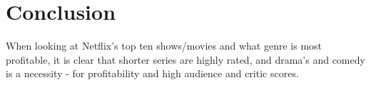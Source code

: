 \documentclass[11pt,preprint, authoryear]{elsarticle}
\numberwithin{equation}{section}
\numberwithin{figure}{section}
\numberwithin{table}{section}
\begin{document}
\hypertarget{conclusion}{%
\section{Conclusion}\label{conclusion}}

When looking at Netflix's top ten shows/movies and what genre is most
profitable, it is clear that shorter series are highly rated, and
drama's and comedy is a necessity - for profitability and high audience
and critic scores.


\end{document}
